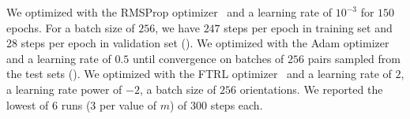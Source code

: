 We optimized  with the RMSProp optimizer~\cite{tieleman2012rmsprop} and a learning rate of $10^{-3}$ for $150$ epochs. For a batch size of $256$, we have $247$ steps per epoch in training set and 28 steps per epoch in validation set ().
We optimized  with the Adam optimizer~\cite{kingma2014adam} and a learning rate of $0.5$ until convergence on batches of $256$ pairs sampled from the test sets ().
We optimized  with the FTRL optimizer~\cite{mcmahan2013ftrl} and a learning rate of $2$, a learning rate power of $-2$, a batch size of $256$ orientations. We reported the lowest of 6 runs (3 per value of $m$) of 300 steps each.



